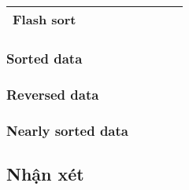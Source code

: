 \begin{table}[H]
\begin{tabular}{|ccccccccc|}
\multicolumn{1}{|c|}{{\color[HTML]{333333} Flash sort}}                                                                           & \multicolumn{1}{c|}{{\color[HTML]{333333} }}                                                                                    & \multicolumn{1}{c|}{{\color[HTML]{333333} }}                                    & \multicolumn{1}{c|}{{\color[HTML]{333333} }}                                                                                    & \multicolumn{1}{c|}{{\color[HTML]{333333} }}                                    & \multicolumn{1}{c|}{{\color[HTML]{333333} }}                                                                                     & \multicolumn{1}{c|}{{\color[HTML]{333333} }}                                    & \multicolumn{1}{c|}{{\color[HTML]{333333} }}                                                                                    & {\color[HTML]{333333} }            \\ \hline
\end{tabular}
\end{table}
\subsubsection{Sorted data}

\subsubsection{Reversed data}

\subsubsection{Nearly sorted data}

\subsection{Nhận xét}